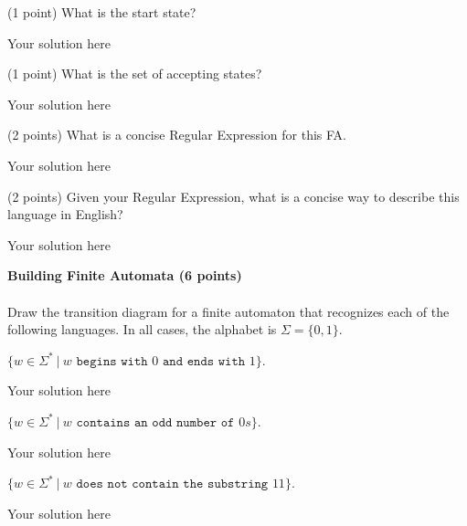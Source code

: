 \documentclass[12pt]{article}
\newenvironment{question}[2][Question]{\begin{trivlist}
\item[\hskip \labelsep {\bfseries #1}\hskip \labelsep {\bfseries #2.}]}{\end{trivlist}}
\newenvironment{solution}[1][Solution:]{\begin{trivlist}
\item[\hskip \labelsep {\bfseries #1}\hskip \labelsep {\bfseries}]\color{blue}}{\end{trivlist}}
\begin{document}
\begin{question}{5}
\begin{enumerate}[(a)]
    \item (1 point) What is the start state?
        \begin{solution}
            Your solution here
        \end{solution}
  \item (1 point) What is the set of accepting states?
        \begin{solution}
           Your solution here
        \end{solution}
  \item (2 points) What is a concise Regular Expression for this FA.
        \begin{solution}
            Your solution here
        \end{solution} 
  \item (2 points) Given your Regular Expression, what is a concise way to describe this language in English?
        \begin{solution}
            Your solution here
        \end{solution}  
  
\end{enumerate}
\end{question}

\clearpage
\begin{question}{6}\textbf{Building Finite Automata (6 points)}\\\\

Draw the transition diagram for a finite automaton that recognizes each of the following languages. In all cases, the alphabet is $\Sigma = \{0,1\}$.
\begin{enumerate}[(a)]
  \item $\{ w \in \Sigma^* \ | \ w \texttt{ begins with } 0 \texttt{ and ends with } 1 \}$.
\begin{solution}
\;
Your solution here
\end{solution} 

  \item $\{ w \in \Sigma^* \ | \ w \texttt{ contains an odd number of } 0s \}$.
\begin{solution}
\;
Your solution here
\end{solution}  
  
  \item $\{ w \in \Sigma^* \ | \ w \texttt{ does not contain the substring } 11 \}$.
\begin{solution}
\;
Your solution here
\end{solution}  

\end{enumerate}
\end{question}
\end{document}

